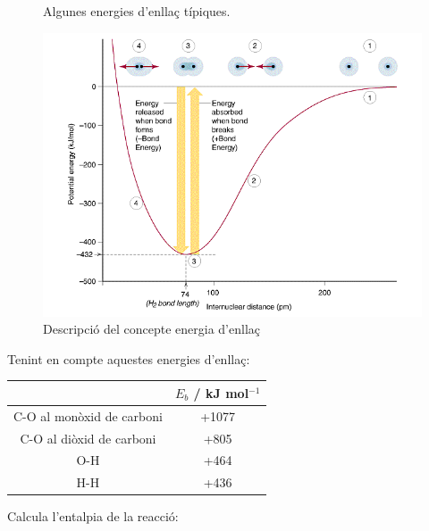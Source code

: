 \begin{figure}[h]
\caption{Algunes energies d'enllaç típiques.}
\label{fig:bond-energy-table}
\end{figure}

\begin{figure}[h]
\centering
\includegraphics[scale=0.5]{figures/ebondh2.png}
\caption{Descripció del concepte energia d'enllaç}
\label{fig:bond-energy-table}
\end{figure}

\begin{exr}
Tenint en compte aquestes energies d'enllaç:

\begin{tabular}{cc}
& $E_b$ / kJ mol$^{-1}$ \\
\hline
C-O al monòxid de carboni & +1077 \\
C-O al diòxid de carboni & +805 \\
O-H & +464 \\
H-H & +436 \\
\hline
\end{tabular}

Calcula l'entalpia de la reacció:
\end{exr}

